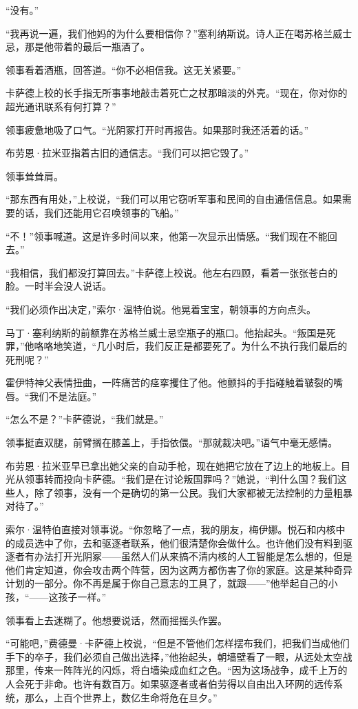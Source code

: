 \documentclass[AutoFakeBold=true]{book}
\begin{document}
``没有。''

``我再说一遍，我们他妈的为什么要相信你？''塞利纳斯说。诗人正在喝苏格兰威士忌，那是他带着的最后一瓶酒了。

领事看着酒瓶，回答道。``你不必相信我。这无关紧要。''

卡萨德上校的长手指无所事事地敲击着死亡之杖那暗淡的外壳。``现在，你对你的超光通讯联系有何打算？''

领事疲惫地吸了口气。``光阴冢打开时再报告。如果那时我还活着的话。''

布劳恩·拉米亚指着古旧的通信志。``我们可以把它毁了。''

领事耸耸肩。

``那东西有用处，''上校说，``我们可以用它窃听军事和民间的自由通信信息。如果需要的话，我们还能用它召唤领事的飞船。''

``不！''领事喊道。这是许多时间以来，他第一次显示出情感。``我们现在不能回去。''

``我相信，我们都没打算回去。''卡萨德上校说。他左右四顾，看着一张张苍白的脸。一时半会没人说话。

``我们必须作出决定，''索尔·温特伯说。他晃着宝宝，朝领事的方向点头。

马丁·塞利纳斯的前额靠在苏格兰威士忌空瓶子的瓶口。他抬起头。``叛国是死罪，''他咯咯地笑道，``几小时后，我们反正是都要死了。为什么不执行我们最后的死刑呢？''

霍伊特神父表情扭曲，一阵痛苦的痉挛攫住了他。他颤抖的手指碰触着皲裂的嘴唇。``我们不是法庭。''

``怎么不是？''卡萨德说，``我们就是。''

领事挺直双腿，前臂搁在膝盖上，手指依偎。``那就裁决吧。''语气中毫无感情。

布劳恩·拉米亚早已拿出她父亲的自动手枪，现在她把它放在了边上的地板上。目光从领事转而投向卡萨德。``我们是在讨论叛国罪吗？''她说，``判什么国？我们这些人，除了领事，没有一个是确切的第一公民。我们大家都被无法控制的力量粗暴对待了。''

索尔·温特伯直接对领事说。``你忽略了一点，我的朋友，梅伊娜。悦石和内核中的成员选中了你，去和驱逐者联系，他们很清楚你会做什么。也许他们没有料到驱逐者有办法打开光阴冢——虽然人们从来搞不清内核的人工智能是怎么想的，但是他们肯定知道，你会攻击两个阵营，因为这两方都伤害了你的家庭。这是某种奇异计划的一部分。你不再是属于你自己意志的工具了，就跟——''他举起自己的小孩，``——这孩子一样。''

领事看上去迷糊了。他想要说话，然而摇摇头作罢。

``可能吧，''费德曼·卡萨德上校说，``但是不管他们怎样摆布我们，把我们当成他们手下的卒子，我们必须自己做出选择，''他抬起头，朝墙壁看了一眼，从远处太空战那里，传来一阵阵光的闪烁，将白墙染成血红之色。``因为这场战争，成千上万的人会死于非命。也许有数百万。如果驱逐者或者伯劳得以自由出入环网的远传系统，那么，上百个世界上，数亿生命将危在旦夕。''
\end{document}
